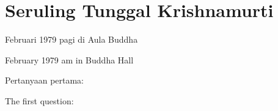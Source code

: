 \chapter{Seruling Tunggal Krishnamurti} %

 Februari 1979 pagi di Aula Buddha

 February 1979 am in Buddha Hall

\bahasa
Pertanyaan pertama:

\english
The first question:

